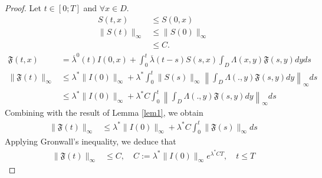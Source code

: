 \documentclass[notitlepage,reqno,11pt]{amsart}
\numberwithin{equation}{section}
\begin{document}
\begin{proof}
Let $t\in [0;T]$ and $\forall x \in D$.
\begin{align*}
S(t,x)&\leq S(0,x)\nonumber\\
\|S(t)\|_{\infty}&\leq\|S(0)\|_{\infty}\nonumber\\
&\leq C.
\end{align*}
\begin{align*}
\mathfrak{F}(t,x) &=\overline{\lambda}^0(t)I(0,x)+\int_0^t\overline{\lambda}(t-s)S(s,x)\int_{D} \Lambda(x,y)\mathfrak{F}(s,y)dyds\\
\|\mathfrak{F}(t)\|_{\infty} &\leq\lambda^*\|I(0)\|_{\infty}+\lambda^*\int_0^t \|S(s)\|_{\infty}\left\|\int_{D} \Lambda(.,y)\mathfrak{F}(s,y)dy\right\|_{\infty}ds\\
&\leq \lambda^*\|I(0)\|_{\infty}+\lambda^*C\int_0^t \left\|\int_{D} \Lambda(.,y)\mathfrak{F}(s,y)dy\right\|_{\infty}ds
\end{align*}
Combining with the result of Lemma \ref{lem1}, we obtain
\begin{align*}
\|\mathfrak{F}(t)\|_{\infty} &\leq\lambda^*\|I(0)\|_{\infty}+\lambda^*C\int_0^t \|\mathfrak{F}(s)\|_{\infty}ds
\end{align*}
Applying Gronwall's inequality, we deduce that
\begin{align*}
\|\mathfrak{F}(t)\|_{\infty} &\leq C,\quad  C:=\lambda^*\|I(0)\|_{\infty}e^{\lambda^*CT}, \quad t\leq T
\end{align*}
\end{proof}
\end{document}
